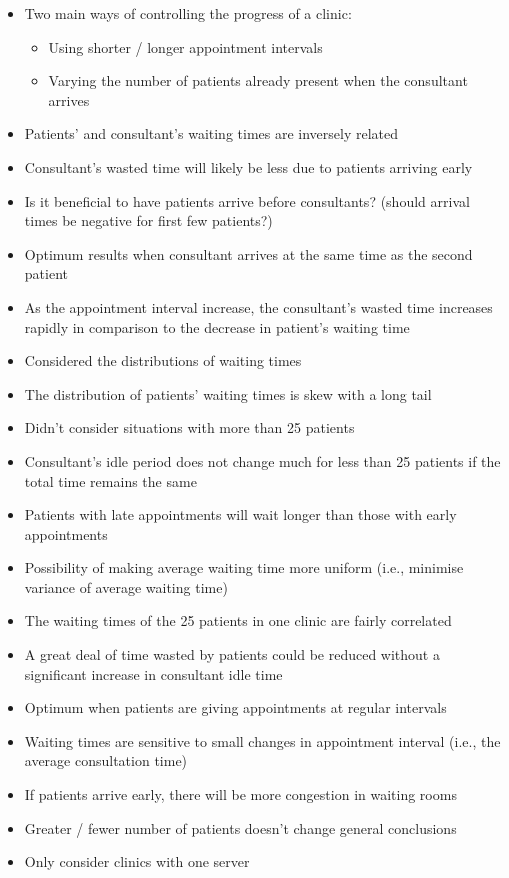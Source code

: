 \documentclass{article}
\begin{document}
\begin{itemize}
    \item Two main ways of controlling the progress of a clinic:
    \begin{itemize}
        \item Using shorter / longer appointment intervals
        \item Varying the number of patients already present when the consultant arrives
    \end{itemize}
    \item Patients' and consultant's waiting times are inversely related
    \item Consultant's wasted time will likely be less due to patients arriving early
    \item Is it beneficial to have patients arrive before consultants? (should arrival times be negative for first few patients?)
    \item Optimum results when consultant arrives at the same time as the second patient
    \item As the appointment interval increase, the consultant's wasted time increases rapidly in comparison to the decrease in patient's waiting time
    \item Considered the distributions of waiting times
    \item The distribution of patients' waiting times is skew with a long tail
    \item Didn't consider situations with more than 25 patients
    \item Consultant's idle period does not change much for less than 25 patients if the total time remains the same
    \item Patients with late appointments will wait longer than those with early appointments
    \item Possibility of making average waiting time more uniform (i.e., minimise variance of average waiting time)
    \item The waiting times of the 25 patients in one clinic are fairly correlated
    \item A great deal of time wasted by patients could be reduced without a significant increase in consultant idle time
    \item Optimum when patients are giving appointments at regular intervals
    \item Waiting times are sensitive to small changes in appointment interval (i.e., the average consultation time)
    \item If patients arrive early, there will be more congestion in waiting rooms
    \item Greater / fewer number of patients doesn't change general conclusions
    \item Only consider clinics with one server
\end{itemize}
\end{document}
